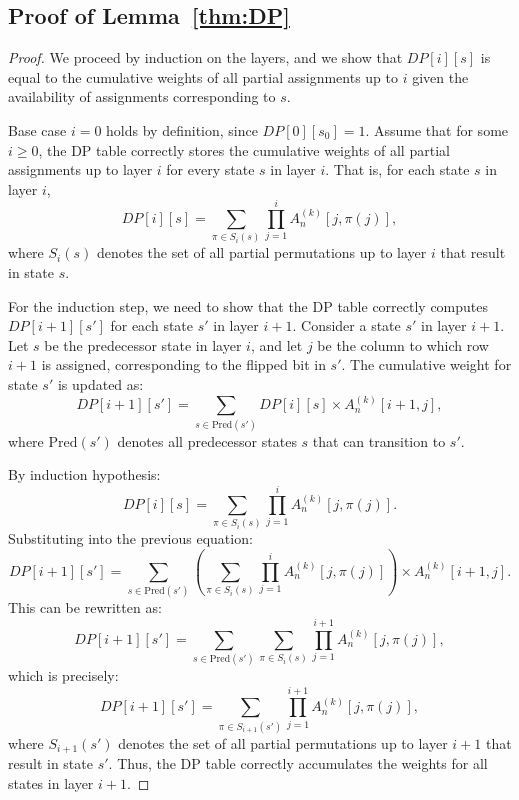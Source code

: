 \documentclass{article}
\begin{document}


\subsection{Proof of  Lemma~\ref{thm:DP}}\label{sec:dp proof}
\begin{proof}%
We proceed by induction on the layers, and we show  that $DP[i][s]$ is equal to the cumulative weights of all partial assignments up to  \(i\) given the availability of assignments corresponding to \(s\).

Base case $i=0$  holds by definition, since $DP[0][s_0] = 1.$ 
Assume that for some \(i \geq 0\), the DP table correctly stores the cumulative weights of all partial assignments up to layer \(i\) for every state \(s\) in layer \(i\). That is, for each state \(s\) in layer \(i\),
\[
DP[i][s] = \sum_{\pi \in S_i(s)} \prod_{j=1}^i A_n^{(k)}[j, \pi(j)],
\]
where \(S_i(s)\) denotes the set of all partial permutations up to layer \(i\) that result in state \(s\).

For the induction step, we need to show that the DP table correctly computes \(DP[i+1][s']\) for each state \(s'\) in layer \(i+1\).
Consider a state \(s'\) in layer \(i+1\). Let \(s\) be the predecessor state in layer \(i\), and let \(j\) be the column to which row \(i+1\) is assigned, corresponding to the flipped bit in \(s'\).
The cumulative weight for state \(s'\) is updated as:
\[
DP[i+1][s'] = \sum_{s \in \text{Pred}(s')} DP[i][s] \times A_n^{(k)}[i+1, j],
\]
where \(\text{Pred}(s')\) denotes all predecessor states \(s\) that can transition to \(s'\).

By induction hypothesis:
\[
DP[i][s] = \sum_{\pi \in S_i(s)} \prod_{j=1}^i A_n^{(k)}[j, \pi(j)].
\]
Substituting into the previous equation:
\[
DP[i+1][s'] = \sum_{s \in \text{Pred}(s')} \left( \sum_{\pi \in S_i(s)} \prod_{j=1}^i A_n^{(k)}[j, \pi(j)] \right) \times A_n^{(k)}[i+1, j].
\]
This can be rewritten as:
\[
DP[i+1][s'] = \sum_{s \in \text{Pred}(s')} \sum_{\pi \in S_i(s)} \prod_{j=1}^{i+1} A_n^{(k)}[j, \pi(j)],
\]
which is precisely:
\[
DP[i+1][s'] = \sum_{\pi \in S_{i+1}(s')} \prod_{j=1}^{i+1} A_n^{(k)}[j, \pi(j)],
\]
where \(S_{i+1}(s')\) denotes the set of all partial permutations up to layer \(i+1\) that result in state \(s'\).
Thus, the DP table correctly accumulates the weights for all states in layer \(i+1\).



\end{proof}
\end{document}
